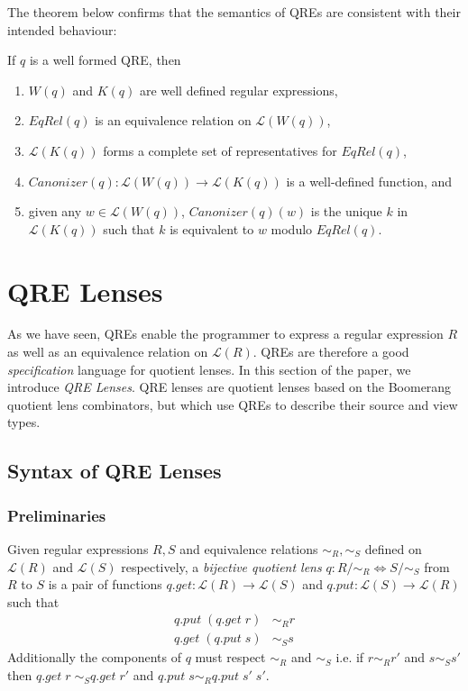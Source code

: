 \documentclass{svproc}
\newcommand{\canonizer}{\ensuremath{\mathit{Canonizer}}}
\begin{document}
The theorem below confirms that the semantics of QREs are consistent with their
intended behaviour:
\begin{theorem}
If $q$ is a well formed QRE, then
\begin{enumerate}
  \item $W(q)$ and $K(q)$ are well defined regular expressions,
  \item  $EqRel(q)$ is an equivalence relation on $\mathcal{L}(W(q))$,
  \item  $\mathcal{L}(K(q))$ forms a complete set of representatives for
  $EqRel(q)$,
  \item $\canonizer(q):\mathcal{L}(W(q)) \longrightarrow \mathcal{L}(K(q))$ is a
  well-defined function, and
  \item  given any $w \in \mathcal{L}(W(q))$, $\canonizer(q)(w)$ is the unique
  $k$ in $\mathcal{L}(K(q))$ such that $k$ is equivalent to $w$ modulo
  $EqRel(q)$.
  \end{enumerate}
\end{theorem}

\section{QRE Lenses}
\label{QRE-lenses} 
As we have seen, QREs enable the programmer to express a regular expression $R$
as well as an equivalence relation on $\mathcal{L}(R)$. QREs are therefore a
good \textit{specification} language for quotient lenses. In this section of the
paper, we introduce \textit{QRE Lenses}. QRE lenses are quotient lenses based on
the Boomerang quotient lens combinators, but which use QREs to describe their
source and view types.

\subsection{Syntax of QRE Lenses}
\subsubsection{Preliminaries}
Given regular expressions $R, S$ and equivalence
relations $\sim_R, \sim_S$ defined on $\mathcal{L}(R)$ and $\mathcal{L}(S)$
respectively, a \textit{bijective quotient lens} $q :
R/{\sim_R}{\Longleftrightarrow} S/{\sim_S}$ from $R$ to $S$ is
a pair of functions $q.get:
\mathcal{L}(R) \longrightarrow \mathcal{L}(S)$ and $q.put : \mathcal{L}(S)
\longrightarrow \mathcal{L}(R)$ such that
\begin{align*}
q.put \; (q.get \; r) &\sim_R r\\
q.get \; (q.put \; s) &\sim_S s
\end{align*}
Additionally the components of $q$ must respect $\sim_R$ and $\sim_S$ i.e.
if $r \sim_R r'$ and $s \sim_S s'$ then $q.get \; r \; \sim_S q.get \; r'$
and $q.put \; s \sim_R q.put \; s' \; s'$.
\end{document}
